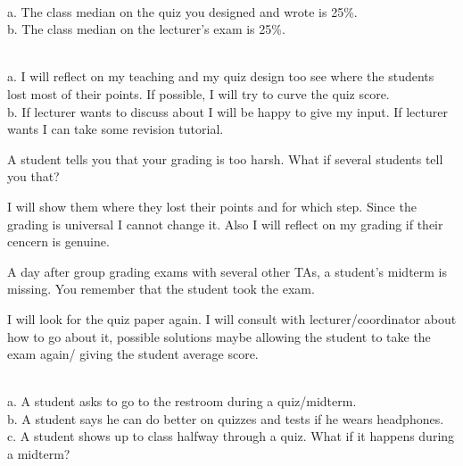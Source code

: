 \begin{prob}\ \\
    a.  The class median on the quiz you designed and wrote is 25\%.\\
    b. The class median on the lecturer's exam is 25\%.
\end{prob}

\begin{solution}\ \\
    a. I will reflect on my teaching and my quiz design too see where the students lost most of their points. If possible, I will try to curve the quiz score.\\
    b. If lecturer wants to discuss about I will be happy to give my input. If lecturer wants I can take some revision tutorial.
\end{solution}

\begin{prob}
    A student tells you that your grading is too harsh. What if several students tell you that?
\end{prob}

\begin{solution}
    I will show them where they lost their points and for which step. Since the grading is universal I cannot change it. Also I will reflect on my grading if their cencern is genuine. 
\end{solution}

\begin{prob}
    A day after group grading exams with several other TAs, a student's midterm is missing. You
remember that the student took the exam. 
\end{prob}

\begin{solution}
    I will look for the quiz paper again. I will consult with lecturer/coordinator about how to go about it, possible solutions maybe allowing the student to take the exam again/ giving the student average score.
\end{solution}

\begin{prob}\ \\
    a. A student asks to go to the restroom during a quiz/midterm.\\
    b. A student says he can do better on quizzes and tests if he wears headphones.\\
    c.  A student shows up to class halfway through a quiz. What if it happens during a midterm? 
\end{prob}

